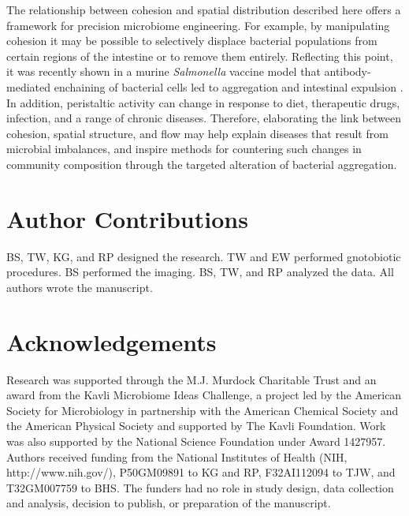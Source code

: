 The relationship between cohesion and spatial distribution described here offers a framework for precision microbiome engineering. For example, by manipulating cohesion it may be possible to selectively displace bacterial populations from certain regions of the intestine or to remove them entirely. Reflecting this point, it was recently shown in a murine \textit{Salmonella} vaccine model that antibody-mediated enchaining of bacterial cells led to aggregation and intestinal expulsion \cite{Moor2017}.  In addition, peristaltic activity can change in response to diet, therapeutic drugs, infection, and a range of chronic diseases. Therefore, elaborating the link between cohesion, spatial structure, and flow may help explain diseases that result from microbial imbalances, and inspire methods for countering such changes in community composition through the targeted alteration of bacterial aggregation. 


 \section{Author Contributions}
BS, TW, KG, and RP designed the research.  TW and EW performed gnotobiotic procedures.  BS performed the imaging.  BS, TW, and RP analyzed the data.  All authors wrote the manuscript.

 \section{Acknowledgements}

Research was supported through the M.J. Murdock Charitable Trust and an award from the Kavli Microbiome Ideas Challenge, a project led by the American Society for Microbiology in partnership with the American Chemical Society and the American Physical Society and supported by The Kavli Foundation. Work was also supported by the National Science Foundation under Award 1427957. Authors received funding from the National Institutes of Health (NIH, http://www.nih.gov/), P50GM09891 to KG and RP, F32AI112094 to TJW, and T32GM007759 to BHS. The funders had no role in study design, data collection and analysis, decision to publish, or preparation of the manuscript.

